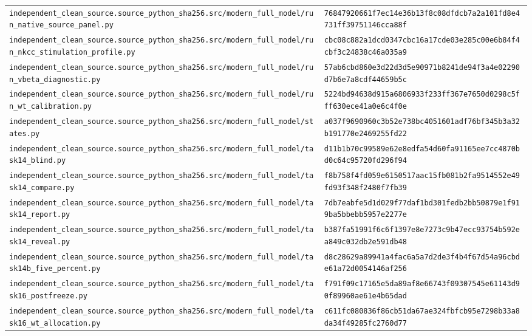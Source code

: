\begin{longtable}{p{.46\linewidth}p{.46\linewidth}}
\nolinkurl{independent_clean_source.source_python_sha256.src/modern_full_model/run_native_source_panel.py} & \nolinkurl{76847920661f7ec14e36b13f8c08dfdcb7a2a101fd8e4731ff39751146cca88f} \\
\nolinkurl{independent_clean_source.source_python_sha256.src/modern_full_model/run_nkcc_stimulation_profile.py} & \nolinkurl{cbc08c882a1dcd0347cbc16a17cde03e285c00e6b84f4cbf3c24838c46a035a9} \\
\nolinkurl{independent_clean_source.source_python_sha256.src/modern_full_model/run_vbeta_diagnostic.py} & \nolinkurl{57ab6cbd860e3d22d3d5e90971b8241de94f3a4e02290d7b6e7a8cdf44659b5c} \\
\nolinkurl{independent_clean_source.source_python_sha256.src/modern_full_model/run_wt_calibration.py} & \nolinkurl{5224bd94638d915a6806933f233ff367e7650d0298c5fff630ece41a0e6c4f0e} \\
\nolinkurl{independent_clean_source.source_python_sha256.src/modern_full_model/states.py} & \nolinkurl{a037f9690960c3b52e738bc4051601adf76bf345b3a32b191770e2469255fd22} \\
\nolinkurl{independent_clean_source.source_python_sha256.src/modern_full_model/task14_blind.py} & \nolinkurl{d11b1b70c99589e62e8edfa54d60fa91165ee7cc4870bd0c64c95720fd296f94} \\
\nolinkurl{independent_clean_source.source_python_sha256.src/modern_full_model/task14_compare.py} & \nolinkurl{f8b758f4fd059e6150517aac15fb081b2fa9514552e49fd93f348f2480f7fb39} \\
\nolinkurl{independent_clean_source.source_python_sha256.src/modern_full_model/task14_report.py} & \nolinkurl{7db7eabfe5d1d029f77daf1bd301fedb2bb50879e1f919ba5bbebb5957e2277e} \\
\nolinkurl{independent_clean_source.source_python_sha256.src/modern_full_model/task14_reveal.py} & \nolinkurl{b387fa51991f6c6f1397e8e7273c9b47ecc93754b592ea849c032db2e591db48} \\
\nolinkurl{independent_clean_source.source_python_sha256.src/modern_full_model/task14b_five_percent.py} & \nolinkurl{d8c28629a89941a4fac6a5a7d2de3f4b4f67d54a96cbde61a72d0054146af256} \\
\nolinkurl{independent_clean_source.source_python_sha256.src/modern_full_model/task16_postfreeze.py} & \nolinkurl{f791f09c17165e5da89af8e66743f09307545e61143d90f89960ae61e4b65dad} \\
\nolinkurl{independent_clean_source.source_python_sha256.src/modern_full_model/task16_wt_allocation.py} & \nolinkurl{c611fc080836f86cb51da67ae324fbfcb95e7298b33a8da34f49285fc2760d77} \\

\end{longtable}
